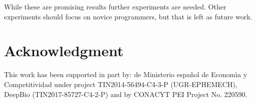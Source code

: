\documentclass[a4paper,twoside]{article}
\begin{document}
While these are promising results further experiments are needed. Other experiments
should focus on novice programmers, but that is left as future
work. %

\section*{Acknowledgment}
This work has been supported in part by: de Ministerio espa\~{n}ol de
Econom\'{\i}a y Competitividad under project TIN2014-56494-C4-3-P
(UGR-EPHEMECH),  DeepBio (TIN2017-85727-C4-2-P) and by CONACYT PEI Project No. 220590.




\vfill
\end{document}
